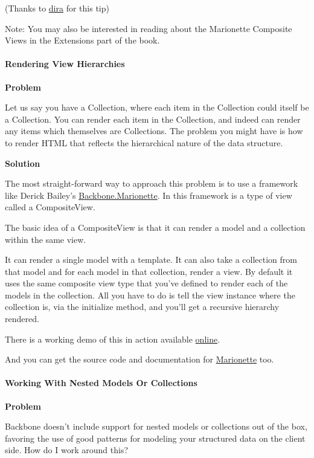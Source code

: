 \documentclass[9pt]{book}
\begin{document}
(Thanks to \href{http://stackoverflow.com/users/906136/dira}{dira} for
this tip)

Note: You may also be interested in reading about the Marionette
Composite Views in the Extensions part of the book.

\paragraph{Rendering View Hierarchies}\label{rendering-view-hierarchies}

\textbf{Problem}

Let us say you have a Collection, where each item in the Collection
could itself be a Collection. You can render each item in the
Collection, and indeed can render any items which themselves are
Collections. The problem you might have is how to render HTML that
reflects the hierarchical nature of the data structure.

\textbf{Solution}

The most straight-forward way to approach this problem is to use a
framework like Derick Bailey's
\href{https://github.com/marionettejs/backbone.marionette}{Backbone.Marionette}.
In this framework is a type of view called a CompositeView.

The basic idea of a CompositeView is that it can render a model and a
collection within the same view.

It can render a single model with a template. It can also take a
collection from that model and for each model in that collection, render
a view. By default it uses the same composite view type that you've
defined to render each of the models in the collection. All you have to
do is tell the view instance where the collection is, via the initialize
method, and you'll get a recursive hierarchy rendered.

There is a working demo of this in action available
\href{http://jsfiddle.net/derickbailey/AdWjU/}{online}.

And you can get the source code and documentation for
\href{https://github.com/marionettejs/backbone.marionette}{Marionette}
too.

\paragraph{Working With Nested Models Or
Collections}\label{working-with-nested-models-or-collections}

\textbf{Problem}

Backbone doesn't include support for nested models or collections out of
the box, favoring the use of good patterns for modeling your structured
data on the client side. How do I work around this?
\end{document}
